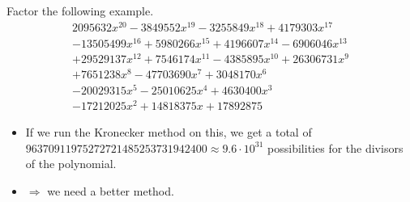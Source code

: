 \begin{frame}
Factor the following example.
\[\begin{array}{l}
2095632 x^{20}-3849552 x^{19}-3255849 x^{18}+4179303 x^{17}\\
-13505499 x^{16}+5980266 x^{15}+4196607 x^{14}-6906046 x^{13}\\
+29529137 x^{12}+7546174 x^{11}-4385895 x^{10}+26306731 x^{9}\\
+7651238 x^{8}-47703690 x^{7}+3048170 x^{6}\\
-20029315 x^{5}-25010625 x^{4}+4630400 x^{3}\\
-17212025 x^{2}+14818375 x+17892875
\end{array}
\]
\begin{itemize}
\item If we run the Kronecker method on this, we get a total of $96370911975272721485253731942400\approx 9.6\cdot 10^{31}$ possibilities for the divisors of the polynomial.
\item $\Rightarrow$ we need a better method.
\end{itemize}

\end{frame}